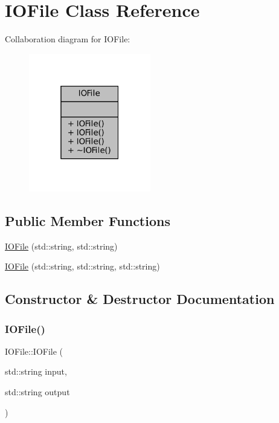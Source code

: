 \hypertarget{classIOFile}{}\section{I\+O\+File Class Reference}
\label{classIOFile}


Collaboration diagram for I\+O\+File\+:
\nopagebreak
\begin{figure}[H]
\begin{center}
\leavevmode
\includegraphics[width=151pt]{classIOFile__coll__graph}
\end{center}
\end{figure}
\subsection*{Public Member Functions}
\begin{DoxyCompactItemize}
\item 
\hyperlink{classIOFile_a1a08441371c84205a8704c6ef0811792}{I\+O\+File} (std\+::string, std\+::string)
\item 
\hyperlink{classIOFile_a25f35de90baaae5b5b8553802285806b}{I\+O\+File} (std\+::string, std\+::string, std\+::string)
\end{DoxyCompactItemize}


\subsection{Constructor \& Destructor Documentation}
\mbox{\label{classIOFile_a1a08441371c84205a8704c6ef0811792}} 
\subsubsection{\texorpdfstring{I\+O\+File()}{IOFile()}\hspace{0.1cm}{\footnotesize\ttfamily [1/2]}}
{\footnotesize\ttfamily I\+O\+File\+::\+I\+O\+File (\begin{DoxyParamCaption}\item[{std\+::string}]{input,  }\item[{std\+::string}]{output }\end{DoxyParamCaption})}

